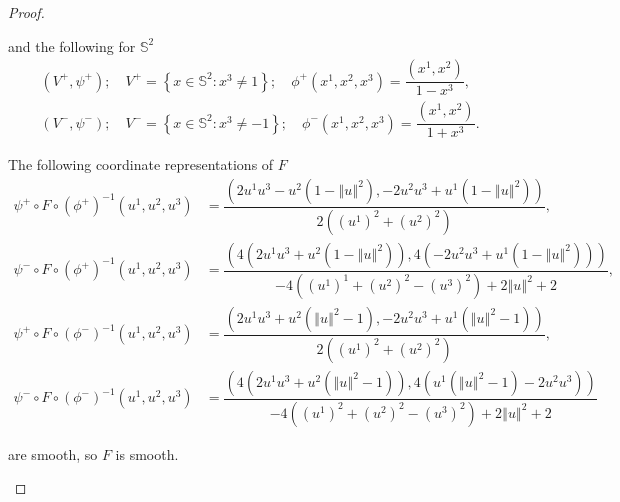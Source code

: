 \begin{proof}
\begin{enumerate}[itemsep=0pt,label={(\alph*)}]
              and the following for \( \mathbb{S}^{2} \)
              \[
                  \begin{split}
                      (V^{+}, \psi^{+}); \quad V^{+} = \left\{ x \in \mathbb{S}^{2} : x^{3} \ne 1 \right\}; \quad \phi^{+}(x^{1}, x^{2}, x^{3}) = \dfrac{(x^{1}, x^{2})}{1 - x^{3}}, \\
                      (V^{-}, \psi^{-}); \quad V^{-} = \left\{ x \in \mathbb{S}^{2} : x^{3} \ne -1 \right\}; \quad \phi^{-}(x^{1}, x^{2}, x^{3}) = \dfrac{(x^{1}, x^{2})}{1 + x^{3}}.
                  \end{split}
              \]

              The following coordinate representations of \( F \)
              \begingroup
              \allowdisplaybreaks%
              \begin{align*}
                  \psi^{+} \circ F \circ {(\phi^{+})}^{-1}(u^{1}, u^{2}, u^{3}) & = \dfrac{\left(2u^{1}u^{3} - u^{2} (1 - {\left\Vert u \right\Vert}^{2}), -2u^{2}u^{3} + u^{1}(1 - {\left\Vert u \right\Vert}^{2})\right)}{2({(u^{1})}^{2} + {(u^{2})}^{2})},                                                               \\
                  \psi^{-} \circ F \circ {(\phi^{+})}^{-1}(u^{1}, u^{2}, u^{3}) & = \dfrac{\left( 4(2u^{1}u^{3} + u^{2}(1 - {\left\Vert u \right\Vert}^{2})), 4(-2u^{2}u^{3} + u^{1}(1 - {\left\Vert u \right\Vert}^{2})) \right)}{-4({(u^{1})}^{1} + {(u^{2})}^{2} - {(u^{3})}^{2}) + 2{\left\Vert u \right\Vert}^{2} + 2}, \\
                  \psi^{+} \circ F \circ {(\phi^{-})}^{-1}(u^{1}, u^{2}, u^{3}) & = \dfrac{\left( 2u^{1}u^{3} + u^{2}({\left\Vert u \right\Vert}^{2} - 1), -2u^{2}u^{3} + u^{1}({\left\Vert u \right\Vert}^{2} - 1) \right)}{2({(u^{1})}^{2} + {(u^{2})}^{2})},                                                              \\
                  \psi^{-} \circ F \circ {(\phi^{-})}^{-1}(u^{1}, u^{2}, u^{3}) & = \dfrac{\left( 4(2u^{1}u^{3} + u^{2}({\left\Vert u \right\Vert}^{2} - 1)), 4(u^{1}({\left\Vert u \right\Vert}^{2} - 1) - 2u^{2}u^{3}) \right)}{-4({(u^{1})}^{2} + {(u^{2})}^{2} - {(u^{3})}^{2}) + 2{\left\Vert u \right\Vert}^{2} + 2}
              \end{align*}
              \endgroup

              are smooth, so \( F \) is smooth.
    \end{enumerate}
\end{proof}

